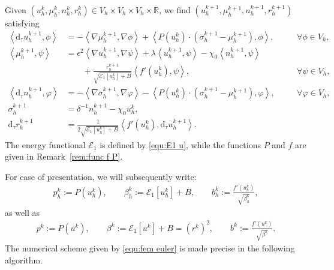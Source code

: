 \documentclass[11pt, reqno]{amsart}
\theoremstyle{definition}
\numberwithin{equation}{section}
\newcommand{\bb}{\mathbb}
\newcommand{\dtt}{\mathrm{d}_\tau}
\newcommand{\inpro}[2]{\left\langle#1,#2\right\rangle}
\begin{document}
Given $(u_h^k, \mu_h^k, n_h^k, r_h^k)\in V_h\times V_h\times V_h\times \bb{R}$, we find $(u_h^{k+1}, \mu_h^{k+1}, n_h^{k+1}, r_h^{k+1})$ satisfying
\begin{subequations}\label{equ:fem euler}
	\begin{alignat}{2}
		\label{equ:fem euler u}
		\inpro{\dtt u_h^{k+1}}{\phi}
		&=
		-\inpro{\nabla \mu_h^{k+1}}{\nabla \phi}
		+
		\inpro{P(u_h^k)\cdot (\sigma_h^{k+1}-\mu_h^{k+1})}{\phi}, \quad &&\forall \phi \in V_h,
		\\
		\inpro{\mu_h^{k+1}}{\psi}
		&=
		\epsilon^2 \inpro{\nabla u_h^{k+1}}{\nabla \psi}
		+
		\lambda \inpro{u_h^{k+1}}{\psi}
		-
		\chi_0 \inpro{n_h^{k+1}}{\psi}
		\nonumber\\
		\label{equ:fem euler mu}
		&\qquad
		+
		\frac{r_h^{k+1}}{\sqrt{\mathcal{E}_1[u_h^k]+B}} \inpro{f'(u_h^k)}{\psi}, \quad &&\forall \psi\in V_h,
		\\
		\label{equ:fem euler n}
		\inpro{\dtt n_h^{k+1}}{\varphi}
		&=
		-\inpro{\nabla \sigma_h^{k+1}}{\nabla \varphi}
		-
		\inpro{P(u_h^k)\cdot (\sigma_h^{k+1}-\mu_h^{k+1})}{\varphi}, \quad &&\forall \varphi \in V_h,
		\\
		\label{equ:fem euler sigma}
		\sigma_h^{k+1}
		&=
		\delta^{-1} n_h^{k+1}
		-
		\chi_0 u_h^k,
		\\
		\label{equ:fem euler r}
		\dtt r_h^{k+1}
		&=
		\frac{1}{2\sqrt{\mathcal{E}_1[u_h^k]+B}}
		\inpro{f'(u_h^k)}{\dtt u_h^{k+1}}.
	\end{alignat}
\end{subequations}
The energy functional $\mathcal{E}_1$ is defined by \eqref{equ:E1 u}, while the functions $P$ and $f$ are given in Remark~\ref{rem:func f P}. 

For ease of presentation, we will subsequently write:	
\begin{align}\label{equ:phk bhk}
	p_h^k:=P(u_h^k),
	\qquad
	\beta_h^k := \mathcal E_1[u_h^k]+B,
	\qquad
	b_h^k:=
	\frac{f'(u_h^k)}{\sqrt{\beta_h^k}},
\end{align}
as well as
\begin{align}\label{equ:beta k bk}
	p^k :=P(u^k),
	\qquad
	\beta^k := \mathcal E_1[u^k]+B = (r^k)^2,
	\qquad
	b^k:=
	\frac{f'(u^k)}{\sqrt{\beta^k}}.
\end{align}
The numerical scheme given by \eqref{equ:fem euler} is made precise in the following algorithm.
\end{document}

